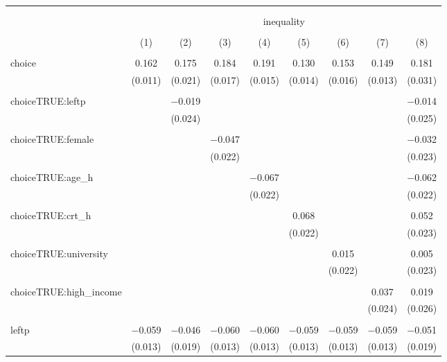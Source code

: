
\begin{table}[!htbp] \centering 
  \caption{} 
  \label{} 
\begin{tabular}{@{\extracolsep{5pt}}lcccccccc} 
\\[-1.8ex]\hline 
\hline \\[-1.8ex] 
\\[-1.8ex] & \multicolumn{8}{c}{inequality} \\ 
\\[-1.8ex] & (1) & (2) & (3) & (4) & (5) & (6) & (7) & (8)\\ 
\hline \\[-1.8ex] 
 choice & 0.162 & 0.175 & 0.184 & 0.191 & 0.130 & 0.153 & 0.149 & 0.181 \\ 
  & (0.011) & (0.021) & (0.017) & (0.015) & (0.014) & (0.016) & (0.013) & (0.031) \\ 
  & & & & & & & & \\ 
 choiceTRUE:leftp &  & $-$0.019 &  &  &  &  &  & $-$0.014 \\ 
  &  & (0.024) &  &  &  &  &  & (0.025) \\ 
  & & & & & & & & \\ 
 choiceTRUE:female &  &  & $-$0.047 &  &  &  &  & $-$0.032 \\ 
  &  &  & (0.022) &  &  &  &  & (0.023) \\ 
  & & & & & & & & \\ 
 choiceTRUE:age\_h &  &  &  & $-$0.067 &  &  &  & $-$0.062 \\ 
  &  &  &  & (0.022) &  &  &  & (0.022) \\ 
  & & & & & & & & \\ 
 choiceTRUE:crt\_h &  &  &  &  & 0.068 &  &  & 0.052 \\ 
  &  &  &  &  & (0.022) &  &  & (0.023) \\ 
  & & & & & & & & \\ 
 choiceTRUE:university &  &  &  &  &  & 0.015 &  & 0.005 \\ 
  &  &  &  &  &  & (0.022) &  & (0.023) \\ 
  & & & & & & & & \\ 
 choiceTRUE:high\_income &  &  &  &  &  &  & 0.037 & 0.019 \\ 
  &  &  &  &  &  &  & (0.024) & (0.026) \\ 
  & & & & & & & & \\ 
 leftp & $-$0.059 & $-$0.046 & $-$0.060 & $-$0.060 & $-$0.059 & $-$0.059 & $-$0.059 & $-$0.051 \\ 
  & (0.013) & (0.019) & (0.013) & (0.013) & (0.013) & (0.013) & (0.013) & (0.019) \\ 

\end{tabular}
\end{table}
